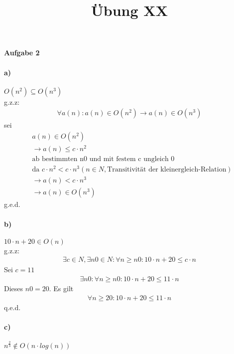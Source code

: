 \documentclass[a4paper,11pt]{scrartcl}
\title{Übung XX}
\begin{document}
\begin{center}
\LARGE{\textbf{Aufgabe 2}}
\end{center}
\paragraph{a)}$O(n^2)\subseteq O(n^3)$\\
g.z.z:
\begin{align*}
\forall a(n): a(n)\in O(n^2) \rightarrow a(n)\in O(n^3)
\end{align*}
sei 
\begin{align*}
&a(n)\in O(n^2)\\ &\rightarrow a(n)\leq c\cdot n^2 \\&\text{ab bestimmten n0 und mit festem c ungleich 0}\\ &\text{da } c\cdot n^2 < c\cdot n^3 (n\in N, \text{Transitivität der kleinergleich-Relation})
\\ &\rightarrow a(n)<c\cdot n^3
\\ &\rightarrow a(n)\in O(n^3)
\end{align*}
g.e.d.
\paragraph{b)}$10\cdot n + 20 \in O(n)$ \\ g.z.z:
\begin{align*}
\exists c\in N, \exists n0\in N: \forall n\geq n0: 10\cdot n + 20 \leq c\cdot n
\end{align*}
Sei $c=11$
\begin{align*}
\exists n0: \forall n\geq n0: 10\cdot n +20 \leq 11\cdot n
\end{align*}
Dieses $n0 = 20$. Es gilt
\begin{align*}
\forall n\geq 20: 10\cdot n +20 \leq 11\cdot n
\end{align*}
q.e.d.
\paragraph{c)} $n^{\frac{2}{3}}\notin O(n\cdot log(n))$
\end{document}
